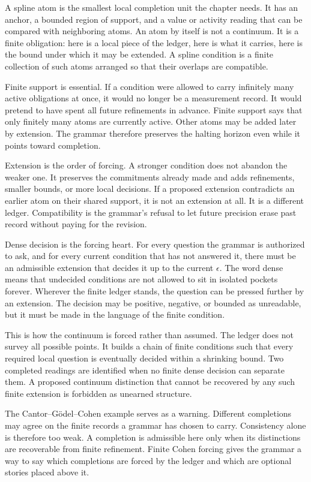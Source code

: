 A spline atom is the smallest local completion unit the chapter needs. It
has an anchor, a bounded region of support, and a value or activity reading
that can be compared with neighboring atoms. An atom by itself is not a
continuum. It is a finite obligation: here is a local piece of the ledger,
here is what it carries, here is the bound under which it may be extended.
A spline condition is a finite collection of such atoms arranged so that
their overlaps are compatible.

Finite support is essential. If a condition were allowed to carry infinitely
many active obligations at once, it would no longer be a measurement record.
It would pretend to have spent all future refinements in advance. Finite
support says that only finitely many atoms are currently active. Other atoms
may be added later by extension. The grammar therefore preserves the
halting horizon even while it points toward completion.

Extension is the order of forcing. A stronger condition does not abandon the
weaker one. It preserves the commitments already made and adds refinements,
smaller bounds, or more local decisions. If a proposed extension contradicts
an earlier atom on their shared support, it is not an extension at all. It is
a different ledger. Compatibility is the grammar's refusal to let future
precision erase past record without paying for the revision.

Dense decision is the forcing heart. For every question the grammar is
authorized to ask, and for every current condition that has not answered it,
there must be an admissible extension that decides it up to the current
\(\epsilon\). The word dense means that undecided conditions are not allowed
to sit in isolated pockets forever. Wherever the finite ledger stands, the
question can be pressed further by an extension. The decision may be
positive, negative, or bounded as unreadable, but it must be made in the
language of the finite condition.

This is how the continuum is forced rather than assumed. The ledger does not
survey all possible points. It builds a chain of finite conditions such that
every required local question is eventually decided within a shrinking
bound. Two completed readings are identified when no finite dense decision
can separate them. A proposed continuum distinction that cannot be recovered
by any such finite extension is forbidden as unearned structure.

The Cantor--G\"odel--Cohen example serves as a warning. Different
completions may agree on the finite records a grammar has chosen to carry.
Consistency alone is therefore too weak. A completion is admissible here
only when its distinctions are recoverable from finite refinement. Finite
Cohen forcing gives the grammar a way to say which completions are forced by
the ledger and which are optional stories placed above it.

